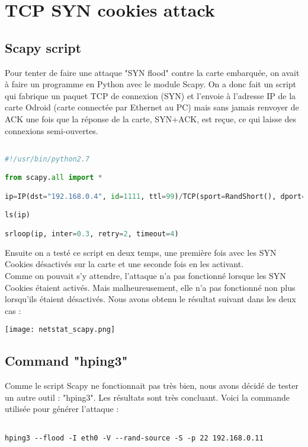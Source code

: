 \section{TCP SYN cookies attack}
\subsection{Scapy script}

Pour tenter de faire une attaque "SYN flood" contre la carte embarquée, on avait à faire un programme en Python avec le module Scapy. On a donc fait un script qui fabrique un paquet TCP de connexion (SYN) et l'envoie à l'adresse IP de la carte Odroid (carte connectée par Ethernet au PC) mais sans jamais renvoyer de ACK une fois que la réponse de la carte, SYN+ACK, est reçue, ce qui laisse des connexions semi-ouvertes.\\

\begin{lstlisting}[frame=single,language=Python]  % Start your code-block

#!/usr/bin/python2.7

from scapy.all import *

ip=IP(dst="192.168.0.4", id=1111, ttl=99)/TCP(sport=RandShort(), dport=[22, 80], seq=12345, ack=1000, window=1000, flags="S")/""

ls(ip)

srloop(ip, inter=0.3, retry=2, timeout=4)
\end{lstlisting}

Ensuite on a testé ce script en deux temps, une première fois avec les SYN Cookies désactivés sur la carte et une seconde fois en les activant.\\

Comme on pouvait s'y attendre, l'attaque n'a pas fonctionné lorsque les SYN Cookies étaient activés. Mais malheureusement, elle n'a pas fonctionné non plus lorsqu'ils étaient désactivés. Nous avons obtenu le résultat suivant dans les deux cas :

\begin{center} 
\hspace{15cm}
\texttt{[image: netstat\_scapy.png]}
\end{center}
\vspace{0.5cm}



\pagebreak
\subsection{Command "hping3"}
Comme le script Scapy ne fonctionnait pas très bien, nous avons décidé de tester un autre outil : "hping3". Les résultats sont très concluant. Voici la commande utilisée pour générer l'attaque :
\begin{lstlisting}[frame=single,style=Console]  % Start your code-block

hping3 --flood -I eth0 -V --rand-source -S -p 22 192.168.0.11
\end{lstlisting}

